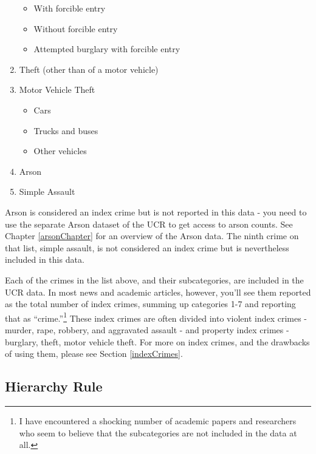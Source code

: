 \documentclass[
]{krantz}
\providecommand{\tightlist}{%
  \setlength{\itemsep}{0pt}\setlength{\parskip}{0pt}}
\begin{document}
\begin{enumerate}
  \begin{itemize}
  \tightlist
  \item
    With forcible entry\\
  \item
    Without forcible entry\\
  \item
    Attempted burglary with forcible entry\\
  \end{itemize}
\item
  Theft (other than of a motor vehicle)\\
\item
  Motor Vehicle Theft

  \begin{itemize}
  \tightlist
  \item
    Cars\\
  \item
    Trucks and buses\\
  \item
    Other vehicles\\
  \end{itemize}
\item
  Arson\\
\item
  Simple Assault
\end{enumerate}

Arson is considered an index crime but is not reported in
this data - you need to use the separate Arson dataset of
the UCR to get access to arson counts. See Chapter
\ref{arsonChapter} for an overview of the Arson data. The
ninth crime on that list, simple assault, is not considered
an index crime but is nevertheless included in this data.

Each of the crimes in the list above, and their
subcategories, are included in the UCR data. In most news
and academic articles, however, you'll see them reported as
the total number of index crimes, summing up categories 1-7
and reporting that as ``crime.''\footnote{I have encountered
  a shocking number of academic papers and researchers who
  seem to believe that the subcategories are not included in
  the data at all.} These index crimes are often divided
into violent index crimes - murder, rape, robbery, and
aggravated assault - and property index crimes - burglary,
theft, motor vehicle theft. For more on index crimes, and
the drawbacks of using them, please see Section
\ref{indexCrimes}.

\subsection{Hierarchy Rule}\label{hierarchy}
\end{document}
